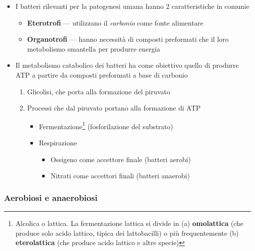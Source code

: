 \documentclass[italian,]{article}
\providecommand{\tightlist}{%
  \setlength{\itemsep}{0pt}\setlength{\parskip}{0pt}}
\begin{document}
\begin{itemize}
\tightlist
\item
  I batteri rilevanti per la patogenesi umana hanno 2 caratteristiche in
  comunie

  \begin{itemize}
  \tightlist
  \item
    \textbf{Eterotrofi} --- utilizzano il \emph{carbonio} come fonte
    alimentare
  \item
    \textbf{Organotrofi} --- hanno necessità di composti preformati che
    il loro metabolismo smantella per produrre energia
  \end{itemize}
\item
  Il metabolismo catabolico dei batteri ha come obiettivo quello di
  produrre ATP a partire da composti preformati a base di carbonio

  \begin{enumerate}
  \def\labelenumi{\arabic{enumi}.}
  \tightlist
  \item
    Glicolisi, che porta alla formazione del piruvato
  \item
    Processi che dal piruvato portano alla formazione di ATP

    \begin{itemize}
    \tightlist
    \item
      Fermentazione\footnote{Alcolica o lattica. La fermentazione
        lattica si divide in (a) \textbf{omolattica} (che produce solo
        acido lattico, tipica dei lattobacilli) o più frequentemente (b)
        \textbf{eterolattica} (che produce acido lattico e altre specie)}
      (fosforilazione del substrato)
    \item
      Respirazione

      \begin{itemize}
      \tightlist
      \item
        Ossigeno come accettore finale (batteri aerobi)
      \item
        Nitrati come accettori finali (batteri anaerobi)
      \end{itemize}
    \end{itemize}
  \end{enumerate}
\end{itemize}

\hypertarget{aerobiosi-e-anaerobiosi}{%
\subsubsection{Aerobiosi e anaerobiosi}\label{aerobiosi-e-anaerobiosi}}
\end{document}
